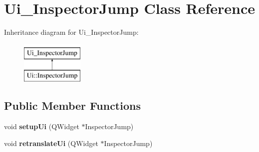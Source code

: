 \hypertarget{class_ui___inspector_jump}{}\section{Ui\+\_\+\+Inspector\+Jump Class Reference}
\label{class_ui___inspector_jump}
Inheritance diagram for Ui\+\_\+\+Inspector\+Jump\+:\begin{figure}[H]
\begin{center}
\leavevmode
\includegraphics[height=2.000000cm]{class_ui___inspector_jump}
\end{center}
\end{figure}
\subsection*{Public Member Functions}
\begin{DoxyCompactItemize}
\item 
\mbox{\label{class_ui___inspector_jump_acf253a4e9d3b91a3813856994586ca15}} 
void {\bfseries setup\+Ui} (Q\+Widget $\ast$Inspector\+Jump)
\item 
\mbox{\label{class_ui___inspector_jump_a4677159cf162f335f37cbd969dd1be8b}} 
void {\bfseries retranslate\+Ui} (Q\+Widget $\ast$Inspector\+Jump)
\end{DoxyCompactItemize}
